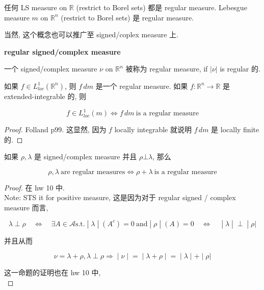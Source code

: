\documentclass{qlnotes-export}
\begin{document}
\begin{example}

任何 LS measure on \(\mathbb{R}\) (restrict to Borel sets) 都是 regular measure. Lebesgue measure \(m\) on \({\mathbb{R}}^{n}\) (restrict to Borel sets) 是 regular measure.

\end{example}

当然, 这个概念也可以推广至 signed/coplex measure 上.

\begin{definition}{\protect{}\label{kn-regular-signed-complex-measure}{\textbf{regular
signed/complex measure}}}

一个 signed/complex measure \(\nu\) on \({\mathbb{R}}^{n}\) 被称为 regular measure, if \(|\nu|\) is regular 的.

\end{definition}

\begin{lemma}

如果 \(f \in L_{loc}^{1}({\mathbb{R}}^{n})\), 则 \(f\, dm\) 是一个 regular measure. 如果 \(f:{\mathbb{R}}^{n}\rightarrow{\mathbb{R}}\) 是 extended-integrable 的, 则

\[f \in L_{loc}^{1}(m)\Leftrightarrow f\, dm\ \text{is a regular measure}\]

\end{lemma}

\begin{proof}

Folland p99. 这显然, 因为 \(f\) locally integrable 就说明 \(f\, dm\) 是 locally finite 的.

\end{proof}

\begin{lemma}

如果 \(\rho,\lambda\) 是 signed/complex measure 并且 \(\rho\bot\lambda\), 那么

\[\rho,\lambda\ \text{are regular measures}\Leftrightarrow\rho + \lambda\ \text{is a regular measure}\]

\end{lemma}

\begin{proof}

在 hw 10 中.\\
Note: STS it for positive measure, 这是因为对于 regular signed / complex measure 而言,

\[\left. \lambda \perp \rho\quad\Leftrightarrow\quad\exists A \in \mathcal{A}\text{s.t.} \middle| \lambda \middle| (A^{c}) = 0\ \text{and} \middle| \rho \middle| (A) = 0\quad\Leftrightarrow\quad \middle| \lambda \middle| \perp \middle| \rho| \right.\]

并且从而

\[\left. \nu = \lambda + \rho,\lambda \perp \rho\Longrightarrow \middle| \nu \middle| = \middle| \lambda + \rho \middle| = \middle| \lambda \middle| + \middle| \rho| \right.\]

这一命题的证明也在 hw 10 中,\\

\end{proof}
\end{document}
